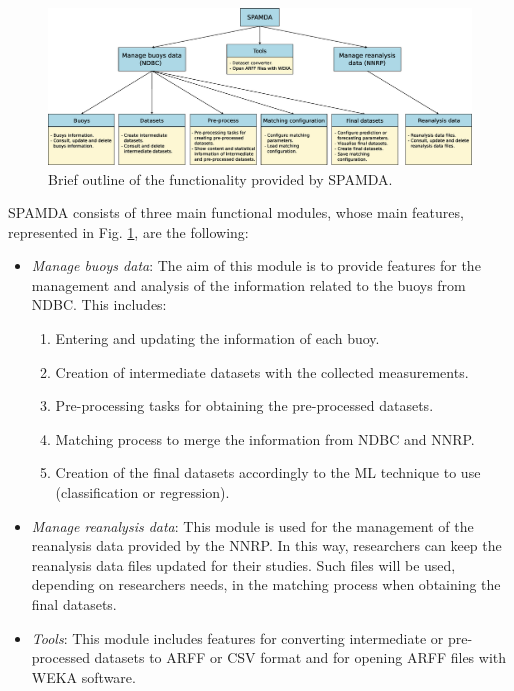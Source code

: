 \documentclass[energies,article,submit,moreauthors,pdftex]{Definitions/mdpi}
\begin{document}
		\begin{figure}[ht!]
			\centering
			\includegraphics[scale=0.33]{figures/FigureSPAMDA.eps}
			\caption{Brief outline of the functionality provided by SPAMDA.}
			\label{fig:SPAMDA}
		\end{figure}
		SPAMDA consists of three main functional modules, whose main features, represented in Fig. \ref{fig:SPAMDA}, are the following:
		\begin{itemize}
			
			
			\item \textit{Manage buoys data}: The aim of this module is to provide features for the management and analysis of the information related to the buoys from NDBC. This includes:
			\begin{enumerate}
				\item Entering and updating the information of each buoy.
				\item Creation of intermediate datasets with the collected measurements.
				\item Pre-processing tasks for obtaining the pre-processed datasets.
				\item Matching process to merge the information from NDBC and NNRP.
				\item Creation of the final datasets accordingly to the ML technique to use (classification or regression).
			\end{enumerate}
			
			\item \textit{Manage reanalysis data}: This module is used for the management of the reanalysis data provided by the NNRP. In this way, researchers can keep the reanalysis data files updated for their studies. Such files will be used, depending on researchers needs, in the matching process when obtaining the final datasets.
			
			\item \textit{Tools}: This module includes features for converting intermediate or pre-processed datasets to ARFF or CSV format and for opening ARFF files with WEKA software.
			
		\end{itemize}
\end{document}
